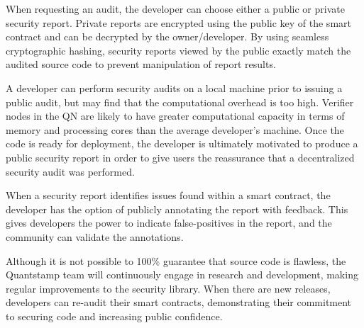 \documentclass[final,smallcondensed]{llncs}
\begin{document}
When requesting an audit, the developer can choose either a public or private security report. Private reports are encrypted using the public key of the smart contract and can be decrypted by the owner/developer. By using seamless cryptographic hashing, security reports viewed by the public exactly match the audited source code to prevent manipulation of report results.

A developer can perform security audits on a local machine prior to issuing a public audit, but may find that the computational overhead is too high. Verifier nodes in the QN are likely to have greater computational capacity in terms of memory and processing cores than the average developer's machine. Once the code is ready for deployment, the developer is ultimately motivated to produce a public security report in order to give users the reassurance that a decentralized security audit was performed.

When a security report identifies issues found within a smart contract, the developer has the option of publicly annotating the report with feedback. This gives developers the power to indicate false-positives in the report, and the community can validate the annotations.

Although it is not possible to 100\% guarantee that source code is flawless, the Quantstamp team will continuously engage in research and development, making regular improvements to the security library. When there are new releases, developers can re-audit their smart contracts, demonstrating their commitment to securing code and increasing public confidence.
\end{document}
